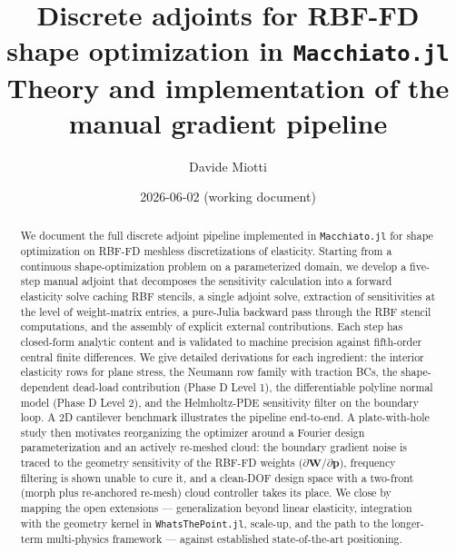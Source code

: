 \documentclass[11pt,a4paper]{article}
\title{
  \textbf{Discrete adjoints for RBF-FD shape optimization in
  \texttt{Macchiato.jl}}\\[0.6em]
  \large Theory and implementation of the manual gradient pipeline
}
\author{Davide Miotti}
\date{2026-06-02 (working document)}
\newcommand{\mat}[1]{\mathbf{#1}}
\newcommand{\vect}[1]{\boldsymbol{#1}}
\newcommand{\pts}{\vect{p}}
\begin{document}
\maketitle

\begin{abstract}
We document the full discrete adjoint pipeline implemented in
\texttt{Macchiato.jl} for shape optimization on RBF-FD meshless
discretizations of elasticity. Starting from a continuous
shape-optimization problem on a parameterized domain, we develop a
five-step manual adjoint that decomposes the sensitivity calculation
into a forward elasticity solve caching RBF stencils, a single adjoint
solve, extraction of sensitivities at the level of weight-matrix
entries, a pure-Julia backward pass through the RBF stencil
computations, and the assembly of explicit external contributions. Each
step has closed-form analytic content and is validated to machine
precision against fifth-order central finite differences. We give
detailed derivations for each ingredient: the interior elasticity
rows for plane stress, the Neumann row family with traction BCs, the
shape-dependent dead-load contribution (Phase D Level 1), the
differentiable polyline normal model (Phase D Level 2), and the
Helmholtz-PDE sensitivity filter on the boundary loop. A 2D cantilever
benchmark illustrates the pipeline end-to-end. A plate-with-hole study
then motivates reorganizing the optimizer around a Fourier design
parameterization and an actively re-meshed cloud: the boundary gradient
noise is traced to the geometry sensitivity of the RBF-FD weights
($\partial\mat W/\partial\pts$), frequency filtering is shown unable to
cure it, and a clean-DOF design space with a two-front (morph plus
re-anchored re-mesh) cloud controller takes its place. We close by mapping the
open extensions --- generalization beyond linear elasticity,
integration with the geometry kernel in
\texttt{WhatsThePoint.jl}, scale-up, and the path to the longer-term
multi-physics framework --- against established state-of-the-art
positioning.
\end{abstract}
\end{document}
